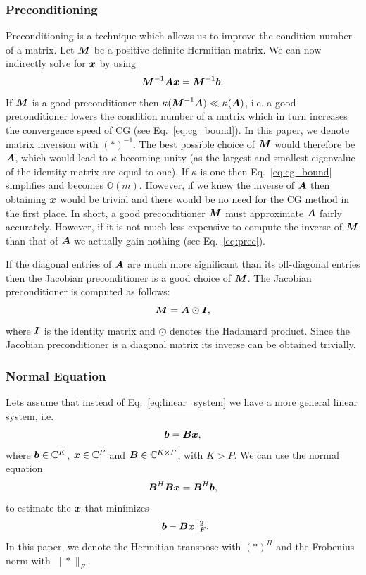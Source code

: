 \documentclass[useAMS,usenatbib]{mn2e}
\newcommand{\bA}{\bmath{A}}
\newcommand{\bB}{\bmath{B}}
\newcommand{\bM}{\bmath{M}}
\newcommand{\bI}{\bmath{I}}
\newcommand{\bb}{\bmath{b}}
\newcommand{\bx}{\bmath{x}}
\begin{document}
\subsubsection{Preconditioning}
\label{sec:precon}
Preconditioning is a technique which allows us to improve the condition number of a matrix. Let $\bM$ be a positive-definite Hermitian matrix.
We can now indirectly solve for $\bx$ by using 
\begin{equation}
\label{eq:prec}
\bM^{-1}\bA\bx = \bM^{-1}\bb.
\end{equation}
If $\bM$ is a good preconditioner then $\kappa(\bM^{-1}\bA) \ll \kappa(\bA)$, i.e. a good preconditioner lowers the condition number of a matrix which in turn increases the convergence speed 
of CG (see Eq.~\eqref{eq:cg_bound}). In this paper, we denote matrix inversion with $(*)^{-1}$. The best possible choice of $\bM$ would therefore be $\bA$, which would lead to $\kappa$ becoming unity (as the largest and smallest eigenvalue of the identity matrix are equal to one).
If $\kappa$ is one then Eq.~\eqref{eq:cg_bound} simplifies and becomes $\mathbb{O}(m)$. However, if we knew the inverse of $\bA$ then obtaining $\bx$ would be trivial and there would be no need for the CG method in the first place. 
In short, a good preconditioner $\bM$ must approximate $\bA$ fairly accurately. However, if it is not much less expensive to 
compute the inverse of $\bM$ than that of $\bA$ we actually gain nothing (see Eq.~\eqref{eq:prec}).  

If the diagonal entries of $\bA$ are much more significant than its off-diagonal entries then the 
Jacobian preconditioner is a good choice of $\bM$. The Jacobian preconditioner is computed as follows:
\begin{equation}
\bM = \bA\odot\bI, 
\end{equation}
where $\bI$ is the identity matrix and $\odot$ denotes the Hadamard product. Since the Jacobian preconditioner is a diagonal matrix its inverse can be obtained trivially.

\subsubsection{Normal Equation}
\label{sec:normal}
Lets assume that instead of Eq.~\eqref{eq:linear_system} we have a more general linear system, i.e.
\begin{equation}
 \bb = \bB\bx,
\end{equation}
where $\bb\in\mathbb{C}^K$, $\bx\in\mathbb{C}^P$  and $\bB\in\mathbb{C}^{K \times P}$, with $K > P$. We can use the normal equation 
\begin{equation}
\label{eq:normal_equation}
\bB^H\bB\bx = \bB^H\bb, 
\end{equation}
to estimate the $\bx$ that minimizes
\begin{equation}
\label{eq:norm_ls}
\|\bb-\bB\bx\|_F^2. 
\end{equation}
In this paper, we denote the Hermitian transpose with $(*)^H$ and the Frobenius norm with $\|*\|_F$.
\end{document}
